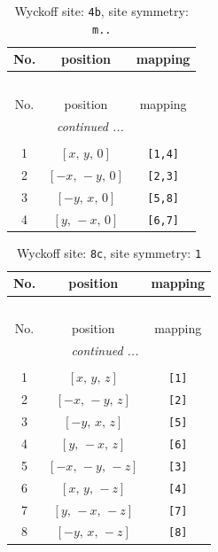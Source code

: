\documentclass[fleqn,8pt]{jsarticle}
\begin{document}
\begin{longtable}{ccc}
\caption{Wyckoff site: {\tt 4b}, site symmetry: {\tt m..}}
 \\
 \hline \hline
No. & position & mapping \\ \hline \endfirsthead

\multicolumn{2}{l}{\tablename\ \thetable{}} \\
 \hline \hline
No. & position & mapping \\ \hline \endhead

 \hline \hline
\multicolumn{2}{r}{\footnotesize\it continued ...} \\ \endfoot

 \hline \hline
\multicolumn{2}{r}{} \\ \endlastfoot

1 & $\left[ x,\, y,\, 0 \right]$ & {\tt [1,4]} \\ \hline
2 & $\left[ - x,\, - y,\, 0 \right]$ & {\tt [2,3]} \\ \hline
3 & $\left[ - y,\, x,\, 0 \right]$ & {\tt [5,8]} \\ \hline
4 & $\left[ y,\, - x,\, 0 \right]$ & {\tt [6,7]} \\
\end{longtable}
\renewcommand{\arraystretch}{1.2}
\begin{longtable}{ccc}
\caption{Wyckoff site: {\tt 8c}, site symmetry: {\tt 1}}
 \\
 \hline \hline
No. & position & mapping \\ \hline \endfirsthead

\multicolumn{2}{l}{\tablename\ \thetable{}} \\
 \hline \hline
No. & position & mapping \\ \hline \endhead

 \hline \hline
\multicolumn{2}{r}{\footnotesize\it continued ...} \\ \endfoot

 \hline \hline
\multicolumn{2}{r}{} \\ \endlastfoot

1 & $\left[ x,\, y,\, z \right]$ & {\tt [1]} \\ \hline
2 & $\left[ - x,\, - y,\, z \right]$ & {\tt [2]} \\ \hline
3 & $\left[ - y,\, x,\, z \right]$ & {\tt [5]} \\ \hline
4 & $\left[ y,\, - x,\, z \right]$ & {\tt [6]} \\ \hline
5 & $\left[ - x,\, - y,\, - z \right]$ & {\tt [3]} \\ \hline
6 & $\left[ x,\, y,\, - z \right]$ & {\tt [4]} \\ \hline
7 & $\left[ y,\, - x,\, - z \right]$ & {\tt [7]} \\ \hline
8 & $\left[ - y,\, x,\, - z \right]$ & {\tt [8]} \\
\end{longtable}
\end{document}
